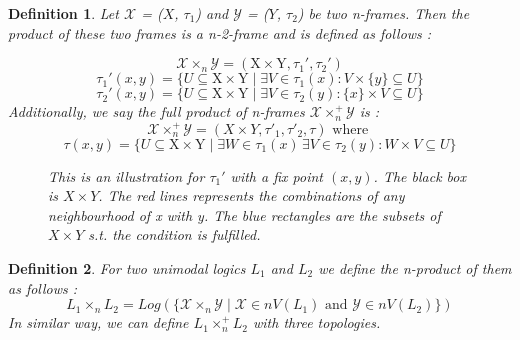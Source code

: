 \documentclass[12pt, a4paper]{scrartcl}
\newtheorem{definition}{Definition}[subsection]
\begin{document}
\begin{definition}
    Let $\mathcal{X}$ = ($X$, $\tau_1$) and $\mathcal{Y}$ = ($Y$, $\tau_2$) be two n-frames. Then the product of these two frames
    is a n-2-frame and is defined as follows : 

    $$ \mathcal{X} \times_n \mathcal{Y} = (\mbox{X} \times \mbox{Y}, \tau_1', \tau_2')$$   
    $$ \tau_1'(x,y) = \{ U \subseteq \mbox{X} \times \mbox{Y} \mid \exists V \in \tau_1(x) : V \times  \{ y \} \subseteq U \}$$
    $$ \tau_2'(x,y) = \{ U \subseteq \mbox{X} \times \mbox{Y} \mid \exists V \in \tau_2(y) : \{ x \} \times V \subseteq U \}$$
    Additionally, we say the full product of n-frames $\mathcal{X} \times^+_n \mathcal{Y}$ is :
    $$ \mathcal{X} \times^+_n \mathcal{Y} = (X \times Y, \tau'_1, \tau'_2, \tau)\mbox{ where }$$
    $$ \tau(x,y) = \{ U \subseteq \mbox{X} \times \mbox{Y} \mid \exists W \in \tau_1(x) \, \exists V \in \tau_2(y) : W \times V \subseteq U \}$$    
    
\begin{figure}[h]
  \centering
  \caption{This is an illustration for $\tau_1'$ with a fix point $(x,y)$. The black box is $X \times Y$. The red lines represents the combinations of any neighbourhood of x with y.
  The blue rectangles are the subsets of $X \times Y$ s.t. the condition is fulfilled.}
\end{figure}
\end{definition}

\begin{definition}
    For two unimodal logics $L_1$ and $L_2$ we define the n-product of them as follows :
    $$ L_1 \times_n L_2 = Log(\{ \mathcal{X} \times_n \mathcal{Y} \mid \mathcal{X} \in nV(L_1) \mbox{ and } \mathcal{Y} \in nV(L_2) \})$$   
    In similar way, we can define $L_1 \times^+_n L_2$ with three topologies.     
\end{definition}
\end{document}
